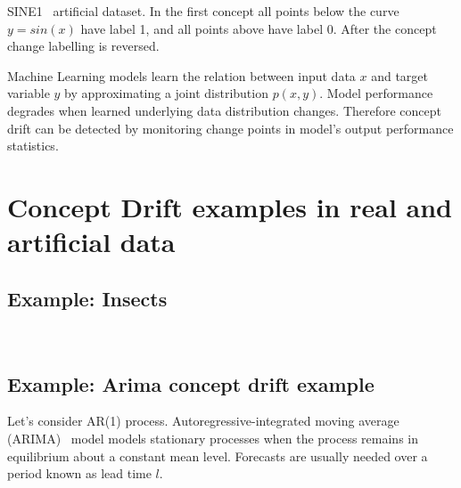 SINE1~\cite{gama2004learning} artificial dataset.
In the first concept all points below the curve $y=sin(x)$ have label 1, and all points above have label 0.
After the concept change labelling is reversed.

Machine Learning models learn the relation between input data $x$ and target variable $y$ by approximating a joint distribution $p(x,y)$. 
Model performance degrades when learned underlying data distribution changes. 
Therefore concept drift can be detected by monitoring change points in model's output performance statistics.

\section{Concept Drift examples in real and artificial data}
\subsection{Example: Insects}
~\cite{SouzaChallenges2020}

\subsection{Example: Arima concept drift example}
Let's consider AR(1) process.
Autoregressive-integrated moving average (ARIMA)~\cite{box2015time} model models stationary processes when the process remains in equilibrium about a constant mean level.
Forecasts are usually needed over a period known as lead time $l$.

